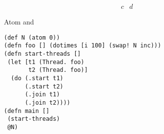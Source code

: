 \begin{frame}[fragile,allowframebreaks=1]
\[
\begin{array}{ll}
c & d
\end{array}
\]

\pagebreak

Atom and 

\begin{lstlisting}
(def N (atom 0))
(defn foo [] (dotimes [i 100] (swap! N inc)))
(defn start-threads []
 (let [t1 (Thread. foo)
       t2 (Thread. foo)]
  (do (.start t1)
      (.start t2)
      (.join t1)
      (.join t2))))
(defn main []
 (start-threads)
 @N)
\end{lstlisting}

\end{frame}
